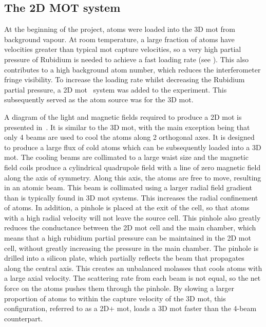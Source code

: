 \subsection{The 2D MOT system}\label{sec:2d_mot}
At the beginning of the project, atoms were loaded into the 3D \ac{mot} from background vapour.
At room temperature, a large fraction of atoms have velocities greater than typical \ac{mot} capture velocities, so a very high partial pressure of
Rubidium is needed to achieve a fast loading rate (see
). This also contributes to a high background atom number, which reduces the interferometer fringe visibility. To increase the loading rate whilst decreasing the Rubidium partial pressure, a 2D \ac{mot}~\cite{Dieckmann1998} system was added to the experiment. This subsequently served as the atom source was for the 3D
\ac{mot}. \par\noindent A diagram of the light and magnetic fields
required to produce a 2D \ac{mot} is presented
in~. It is similar to the 3D \ac{mot}, with the
main exception being that only 4 beams are used to cool the atoms along 2
orthogonal axes. It is designed to produce a large flux of cold atoms which can be subsequently loaded into a
3D \ac{mot}. The cooling beams are collimated to a
large waist size and the magnetic field coils produce a cylindrical quadrupole
field with a line of zero magnetic field along the axis of symmetry. Along this
axis, the atoms are free to move, resulting in an atomic beam. This beam is collimated using a larger  radial field gradient than is typically found in 3D \ac{mot} systems. This increases the radial confinement of
atoms. In addition, a pinhole is placed at the exit of the cell, so that atoms
with a high radial velocity will not leave the source cell. This pinhole also
greatly reduces the conductance between the 2D \ac{mot} cell and the main
chamber, which means that a high rubidium partial pressure can be maintained in the 2D \ac{mot} cell, without greatly
increasing the pressure in the main chamber. The pinhole is drilled into a
silicon plate, which partially reflects the beam that propagates along
the central axis. This creates an unbalanced molasses that cools atoms with a
large axial velocity. The scattering rate from each beam is not equal, so the net force on the atoms  pushes them through the pinhole. By slowing a larger proportion of atoms to within the
capture velocity of the 3D \ac{mot}, this configuration, referred to as a 2D\(+\)
\ac{mot}, loads a 3D \ac{mot} faster than the 4-beam counterpart. \par\noindent
